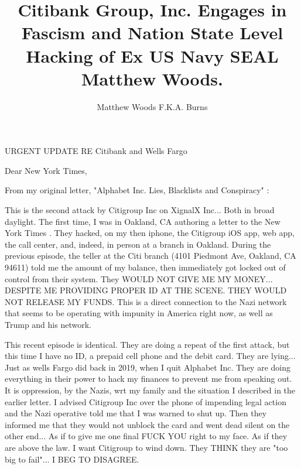 \documentclass[a4paper]{arthur-letter}
\title{Citibank Group, Inc. Engages in Fascism and Nation State Level Hacking of Ex US Navy SEAL Matthew Woods.}
\author{Matthew Woods F.K.A. Burns}
\begin{document}
    \makeprofile %
    
    \address{Matthew Woods,\\PO Box 376\\Mountain View, CA, 94042}

    \begin{letter}

    \subject{TLDR: I'm a former Navy SEAL, smeared by Dianna Cowern (AKA Physics Girl) via Alphabet Inc. while working as a Google employee. From 2015-2020, I have experienced severe police misconduct first hand. This is across five counties: San Diego, Orange, Santa Clara, Oahu and Hawaii. I think they may have ties to THE Nazis, since my entire immediate family (Donald Burns, Anne Burns and Susan Burns) are Nazis... the type that agree with Adolf Hitler and Eichmann of WWII. They lied to me about this since I was born. Target Corporation, local strip malls and police succumb to fascism and try to suppress me in all ways. on top of that, Citigroup Inc. and Wells Fargo launch denial of service attacks to me and XignalX Inc: a struggling startup owned by disabled former US Navy SEALs in Hawaii. Nation state level hacking is apparent.
}
            
    URGENT UPDATE RE Citibank and Wells Fargo
            
    \opening{Dear New York Times,}
            
    From my original letter, "Alphabet Inc. Lies, Blacklists and Conspiracy" \cite{alphabetinc}:

    This is the second attack by Citigroup Inc on XignalX Inc... Both in broad daylight. The first time, I was in Oakland, CA authoring a letter to the New York Times \cite{alphabetinc}. They hacked, on my then iphone, the Citigroup iOS app, web app, the call center, and, indeed, in person at a branch in Oakland. During the previous episode, the teller at the Citi branch (4101 Piedmont Ave, Oakland, CA 94611) told me the amount of my balance, then immediately got locked out of control from their system. They WOULD NOT GIVE ME MY MONEY... DESPITE ME PROVIDING PROPER ID AT THE SCENE. THEY WOULD NOT RELEASE MY FUNDS. This is a direct connection to the Nazi network that seems to be operating with impunity in America right now, as well as Trump and his network.

    This recent episode is identical. They are doing a repeat of the first attack, but this time I have no ID, a prepaid cell phone and the debit card. They are lying... Just as wells Fargo did back in 2019, when I quit Alphabet Inc. They are doing everything in their power to hack my finances to prevent me from speaking out. It is oppression, by the Nazis, wrt my family and the situation I described in the earlier letter. I advised Citigroup Inc over the phone of impending legal action and the Nazi operative told me that I was warned to shut up. Then they informed me that they would not unblock the card and went dead silent on the other end... As if to give me one final FUCK YOU right to my face. As if they are above the law. I want Citigroup to wind down. They THINK they are "too big to fail"... I BEG TO DISAGREE. 


\end{letter}
\end{document}
